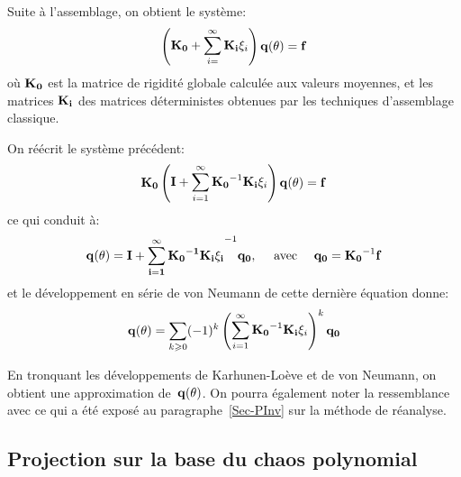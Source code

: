 Suite à l'assemblage, on obtient le système:
\begin{equation}\label{Eq-StoKLEx}
\PP{\MM{K_0}+\dsum_{i=}^\infty\MM{K_i}\xi_i}\VV{q(\theta)}=\VV{f}
\end{equation}
où $\MM{K_0}$ est la matrice de rigidité globale calculée aux valeurs moyennes, et les matrices $\MM{K_i}$ des matrices déterministes obtenues par les techniques d'assemblage classique.

On réécrit le système précédent:
\begin{equation}
\MM{K_0}\PP{\MM{I}+\dsum_{i=1}^\infty\MMI{K_0}\MM{K_i}\xi_i}\VV{q(\theta)}=\VV{f}
\end{equation}
ce qui conduit à:
\begin{equation}
\VV{q(\theta)} = \MMI{\MM{I}+\dsum_{i=1}^\infty\MMI{K_0}\MM{K_i}\xi_i}\VV{q_0}, \quad \text{ avec } \quad \VV{q_0}=\MMI{K_0}\VV{f}
\end{equation}
et le développement en série de von Neumann de cette dernière équation donne:
\begin{equation}\label{Eq-StoQ}
\VV{q(\theta)} = \dsum_{k\ge0} (-1)^k \PP{\dsum_{i=1}^\infty\MMI{K_0}\MM{K_i}\xi_i}^k\VV{q_0}
\end{equation}

En tronquant les développements de Karhunen-Loève et de von Neumann, on obtient une approximation de~$\VV{q(\theta)}$. On pourra également noter la ressemblance avec ce qui a été exposé au paragraphe~\ref{Sec-PInv} sur la méthode de réanalyse.

\medskip
\subsection{Projection sur la base du chaos polynomial}

